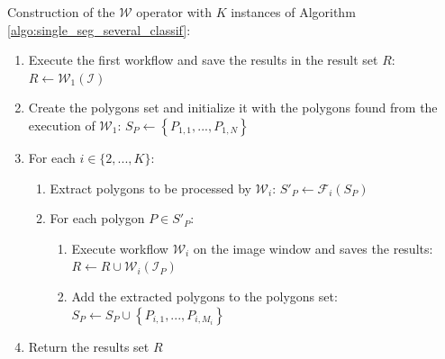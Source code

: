 \begin{algorithm} \label{algo:chaining_workflows}
	Construction of the $\mathcal{W}$ operator with $K$ instances of Algorithm \ref{algo:single_seg_several_classif}:

	\begin{enumerate}
		\item Execute the first workflow and save the results in the result set $R$: $R \leftarrow \mathcal{W}_1(\mathcal{I})$
		\item Create the polygons set and initialize it with the polygons found from the execution of $\mathcal{W}_1$: $S_P \leftarrow \left\{P_{1,1}, ..., P_{1,N}\right\}$
		\item For each $i \in \{2, ..., K\}$:
		\begin{enumerate}
			\item Extract polygons to be processed by $\mathcal{W}_i$: $S'_P \leftarrow \mathcal{F}_i(S_P)$
			\item For each polygon $P \in S'_P$:
			\begin{enumerate}
				\item Execute workflow $\mathcal{W}_i$ on the image window and saves the results: $R \leftarrow R \cup \mathcal{W}_i(\mathcal{I}_P)$
				\item Add the extracted polygons to the polygons set: $S_P \leftarrow S_P \cup \left\{P_{i,1}, ..., P_{i,M_i}\right\}$
			\end{enumerate}
		\end{enumerate}
		\item Return the results set $R$
	\end{enumerate}
\end{algorithm}

